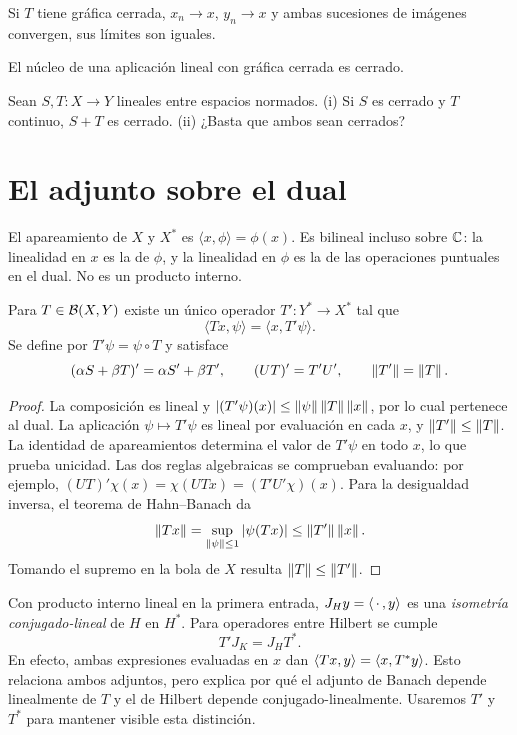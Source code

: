 \begin{ejercicio}\label{ej:v3-l03-6}
Si $T$ tiene gráfica cerrada, $x_n\to x$, $y_n\to x$ y ambas sucesiones de imágenes convergen, sus límites son iguales.
\end{ejercicio}


\begin{ejercicio}\label{ej:v3-l03-7}
El núcleo de una aplicación lineal con gráfica cerrada es cerrado.
\end{ejercicio}


\begin{ejercicio}\label{ej:v3-l03-8}
Sean $S,T:X\to Y$ lineales entre espacios normados. (i) Si $S$ es cerrado y $T$ continuo, $S+T$ es cerrado. (ii) ¿Basta que ambos sean cerrados?
\end{ejercicio}


\section{El adjunto sobre el dual}\label{lec:v3-04}
El apareamiento de $X$ y $X^*$ es $\langle x,\phi\rangle=\phi(x)$. Es bilineal incluso sobre $\mathbb C$: la linealidad en $x$ es la de $\phi$, y la linealidad en $\phi$ es la de las operaciones puntuales en el dual. No es un producto interno.

\begin{proposicion}\label{v3:adjunto-banach}
Para $T\in\mathcal B(X,Y)$ existe un único operador $T':Y^*\to X^*$ tal que
\[\langle Tx,\psi\rangle=\langle x,T'\psi\rangle.
\]
Se define por $T'\psi=\psi\circ T$ y satisface
\[(\alpha S+\beta T)'=\alpha S'+\beta T',\qquad(UT)'=T'U',\qquad\left\lVert T'\right\rVert=\left\lVert T\right\rVert.
\]
\end{proposicion}
\begin{proof}
La composición es lineal y $|(T'\psi)(x)|\le\left\lVert\psi\right\rVert\left\lVert T\right\rVert\left\lVert x\right\rVert$, por lo cual pertenece al dual. La aplicación $\psi\mapsto T'\psi$ es lineal por evaluación en cada $x$, y $\left\lVert T'\right\rVert\le\left\lVert T\right\rVert$. La identidad de apareamientos determina el valor de $T'\psi$ en todo $x$, lo que prueba unicidad. Las dos reglas algebraicas se comprueban evaluando: por ejemplo, $(UT)'\chi(x)=\chi(UTx)=(T'U'\chi)(x)$. Para la desigualdad inversa, el teorema de Hahn--Banach da
\[\left\lVert Tx\right\rVert=\sup_{\left\lVert\psi\right\rVert\le1}|\psi(Tx)|
\le\left\lVert T'\right\rVert\left\lVert x\right\rVert.
\]
Tomando el supremo en la bola de $X$ resulta $\left\lVert T\right\rVert\le\left\lVert T'\right\rVert$.
\end{proof}
Con producto interno lineal en la primera entrada, $J_Hy=\left\langle\,\cdot\,,y\right\rangle$ es una \emph{isometría conjugado-lineal} de $H$ en $H^*$. Para operadores entre Hilbert se cumple
\[T'J_K=J_HT^*.
\]
En efecto, ambas expresiones evaluadas en $x$ dan $\left\langle Tx,y\right\rangle=\left\langle x,T^*y\right\rangle$. Esto relaciona ambos adjuntos, pero explica por qué el adjunto de Banach depende linealmente de $T$ y el de Hilbert depende conjugado-linealmente. Usaremos $T'$ y $T^*$ para mantener visible esta distinción.

